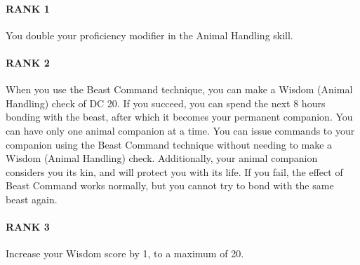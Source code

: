 \paragraph{RANK 1} You double your proficiency modifier in the Animal Handling skill.
\paragraph{RANK 2} When you use the Beast Command technique, you can make a Wisdom (Animal Handling) check of DC 20.
If you succeed, you can spend the next 8 hours bonding with the beast, after which it becomes your permanent companion.
You can have only one animal companion at a time.
You can issue commands to your companion using the Beast Command technique without needing to make a Wisdom (Animal Handling) check.
Additionally, your animal companion considers you its kin, and will protect you with its life.
If you fail, the effect of Beast Command works normally, but you cannot try to bond with the same beast again.
\paragraph{RANK 3} Increase your Wisdom score by 1, to a maximum of 20.

